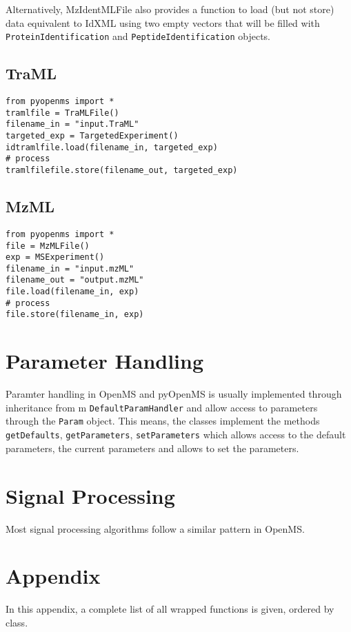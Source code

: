 \documentclass[10pt]{article}
\begin{document}
Alternatively, MzIdentMLFile also provides a function to load (but not store)
data equivalent to IdXML using two empty vectors that will be filled with
\texttt{ProteinIdentification} and \texttt{PeptideIdentification} objects.

\subsection{TraML}
\begin{verbatim}
from pyopenms import *
tramlfile = TraMLFile() 
filename_in = "input.TraML"
targeted_exp = TargetedExperiment()
idtramlfile.load(filename_in, targeted_exp)
# process 
tramlfilefile.store(filename_out, targeted_exp)
\end{verbatim}

\subsection{MzML}
\begin{verbatim}
from pyopenms import *
file = MzMLFile() 
exp = MSExperiment() 
filename_in = "input.mzML"
filename_out = "output.mzML"
file.load(filename_in, exp)
# process 
file.store(filename_in, exp)
\end{verbatim}

\pagebreak
\section{Parameter Handling}

Paramter handling in OpenMS and pyOpenMS is usually implemented through
inheritance from 
m \texttt{DefaultParamHandler} and allow access to parameters through
the \texttt{Param} object. This means, the classes implement the methods
\texttt{getDefaults}, \texttt{getParameters}, \texttt{setParameters} which
allows access to the default parameters, the current parameters and allows to
set the parameters.
\section{Signal Processing}
Most signal processing algorithms follow a similar pattern in OpenMS. 

\section{Appendix}
In this appendix, a complete list of all wrapped functions is given, ordered
by class.

\end{document}
